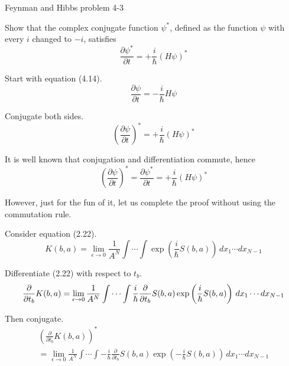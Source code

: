 \documentclass[12pt]{article}
\begin{document}
\begin{center}
Feynman and Hibbs problem 4-3
\end{center}

Show that the complex conjugate function $\psi^*$,
defined as the function $\psi$ with every $i$ changed to $-i$,
satisfies
\begin{equation*}
\frac{\partial\psi^*}{\partial t}=+\frac{i}{\hbar}(H\psi)^*
\end{equation*}

Start with equation (4.14).
\begin{equation*}
\frac{\partial\psi}{\partial t}=-\frac{i}{\hbar}H\psi
\tag{4.14}
\end{equation*}

Conjugate both sides.
\begin{equation*}
\left(\frac{\partial\psi}{\partial t}\right)^*=+\frac{i}{\hbar}(H\psi)^*
\end{equation*}

It is well known that conjugation and differentiation commute, hence
\begin{equation*}
\left(\frac{\partial\psi}{\partial t}\right)^*=\frac{\partial\psi^*}{\partial t}=+\frac{i}{\hbar}(H\psi)^*
\end{equation*}

However, just for the fun of it, let us complete the proof without using the commutation rule.

\bigskip
Consider equation (2.22).
\begin{equation*}
K(b,a)=\lim_{\epsilon\rightarrow0}\frac{1}{A^N}\int\cdots\int
\exp\left(\frac{i}{\hbar}S(b,a)\right)\,dx_1\cdots dx_{N-1}
\tag{2.22}
\end{equation*}

Differentiate (2.22) with respect to $t_b$.
\begin{equation*}
\frac{\partial}{\partial t_b}K(b,a)
\\
=
\lim_{\epsilon\rightarrow0}\frac{1}{A^N}
\int\cdots\int
\frac{i}{\hbar}\frac{\partial}{\partial t_b}S(b,a)
\exp\left(\frac{i}{\hbar}S(b,a)\right)\,dx_1\cdots dx_{N-1}
\end{equation*}

Then conjugate.
\begin{multline*}
\left(\frac{\partial}{\partial t_b}K(b,a)\right)^*
\\
=\lim_{\epsilon\rightarrow0}\frac{1}{A^N}
\int\cdots\int
-\frac{i}{\hbar}\frac{\partial}{\partial t_b}S(b,a)
\exp\left(-\frac{i}{\hbar}S(b,a)\right)\,dx_1\cdots dx_{N-1}
\end{multline*}
\end{document}
